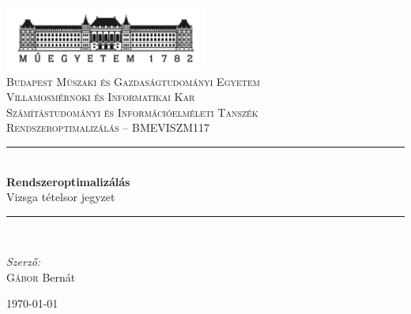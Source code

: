 \hypersetup{pageanchor=false}
\begin{titlepage}
	\newcommand{\HRule}{\rule{\linewidth}{0.5mm}}
	\begin{center}

		\includegraphics[width=0.5\textwidth]{./kepek/Budapest-logo.jpg}\\
		\textsc{Budapest Műszaki és Gazdaságtudományi Egyetem}\\
		\textsc{Villamosmérnöki és Informatikai Kar}\\
		\textsc{Számítástudományi és Információelméleti Tanszék}\\[1.5cm]
		\textsc{Rendszeroptimalizálás -- BMEVISZM117}\\[0.5cm]

		\HRule \\[0.4cm]
		{ \huge \bfseries Rendszeroptimalizálás}\\[0.4cm]
		{Vizsga tételsor jegyzet}

		\HRule \\[1.5cm]

		\begin{minipage}{0.4\textwidth}
			\begin{flushleft} \large
				\emph{Szerző:}\\
				\textsc{Gábor} Bernát
			\end{flushleft}
		\end{minipage}

		\vfill
		{\large \today}
	\end{center}
\end{titlepage}
\hypersetup{pageanchor=false}
